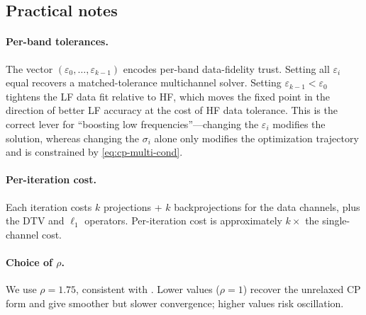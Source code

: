 \documentclass{article}
\newcommand{\eps}{\varepsilon}
\begin{document}
\subsection{Practical notes}

\paragraph{Per-band tolerances.}
The vector $(\eps_0, \ldots, \eps_{k-1})$ encodes per-band data-fidelity
trust. Setting all $\eps_i$ equal recovers a matched-tolerance
multichannel solver. Setting $\eps_{k-1} < \eps_0$ tightens the LF
data fit relative to HF, which moves the fixed point in the direction
of better LF accuracy at the cost of HF data tolerance. This is the
correct lever for ``boosting low frequencies''---changing the $\eps_i$
modifies the solution, whereas changing the $\sigma_i$ alone only
modifies the optimization trajectory and is constrained by
\eqref{eq:cp-multi-cond}.

\paragraph{Per-iteration cost.}
Each iteration costs $k$ projections + $k$ backprojections for the
data channels, plus the DTV and $\ell_1$ operators. Per-iteration cost
is approximately $k\times$ the single-channel cost.

\paragraph{Choice of $\rho$.}
We use $\rho = 1.75$, consistent with \citet{sidky2012}. Lower values
($\rho = 1$) recover the unrelaxed CP form and give smoother but
slower convergence; higher values risk oscillation.

%
%
\end{document}
